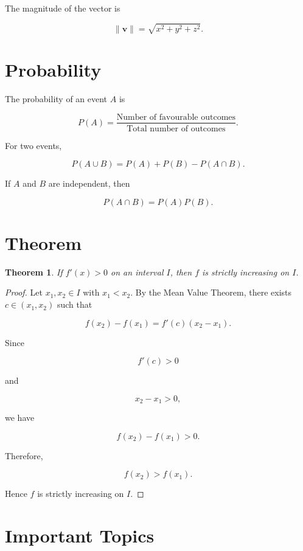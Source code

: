 \documentclass[12pt,a4paper]{article}
\newtheorem{theorem}{Theorem}
\begin{document}
The magnitude of the vector is

\[
\|\mathbf{v}\|
=
\sqrt{x^2+y^2+z^2}.
\]

\section{Probability}

The probability of an event \(A\) is

\[
P(A)
=
\frac{\text{Number of favourable outcomes}}
{\text{Total number of outcomes}}.
\]

For two events,

\[
P(A\cup B)
=
P(A)+P(B)-P(A\cap B).
\]

If \(A\) and \(B\) are independent, then

\[
P(A\cap B)
=
P(A)P(B).
\]

\section{Theorem}

\begin{theorem}
If \(f'(x)>0\) on an interval \(I\), then \(f\) is strictly increasing on \(I\).
\end{theorem}

\begin{proof}
Let \(x_1,x_2\in I\) with \(x_1<x_2\).
By the Mean Value Theorem, there exists
\(c\in(x_1,x_2)\) such that

\[
f(x_2)-f(x_1)
=
f'(c)(x_2-x_1).
\]

Since

\[
f'(c)>0
\]

and

\[
x_2-x_1>0,
\]

we have

\[
f(x_2)-f(x_1)>0.
\]

Therefore,

\[
f(x_2)>f(x_1).
\]

Hence \(f\) is strictly increasing on \(I\).
\end{proof}

\section{Important Topics}
\end{document}
